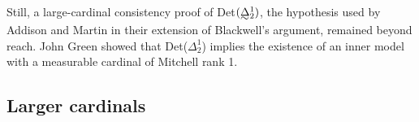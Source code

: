 \documentclass{book}%
\newcommand{\game}{\rotate[u]{\rotate[f]{$\Game$}}}
\def\underTilde#1{{\baselineskip=0pt\vtop{\hbox{$#1$}\hbox{$\sim$}}}{}}
\newcommand{\less}{\mathord{<}}
\begin{document}
Still, a large-cardinal consistency proof of Det$(\underTilde{\Delta}^{1}_{2})$, the hypothesis used by Addison and Martin in their
extension of Blackwell's argument, remained beyond reach. John Green  showed that Det($\Delta^{1}_{2}$) implies
the existence of an inner model with a measurable cardinal of
Mitchell rank 1.



\subsection{Larger cardinals}
\end{document}
